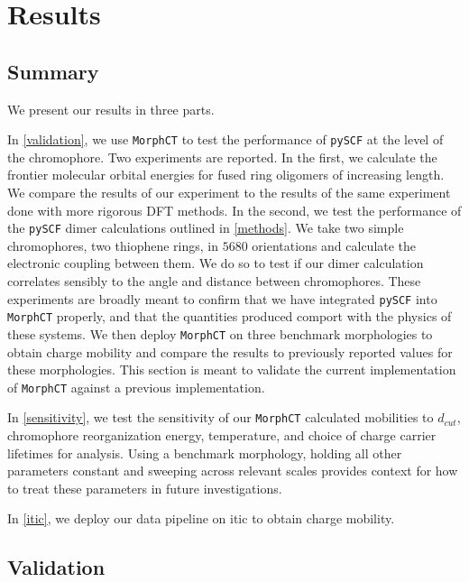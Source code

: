 \chapter{Results}
\label{results}

\section{Summary}

We present our results in three parts. 

In \autoref{validation}, we use \texttt{MorphCT} to test the performance of \texttt{pySCF} at the level of the chromophore.
Two experiments are reported. In the first, we calculate the frontier molecular orbital
energies for fused ring oligomers of increasing length. We compare the results of our experiment to the
results of the same experiment done with more rigorous DFT methods. In the second, we test the 
performance of the \texttt{pySCF} dimer calculations outlined in \autoref{methods}. 
We take two simple chromophores, two thiophene rings, in $5680$ orientations and calculate the
electronic coupling between them. We do so to test if our dimer calculation correlates sensibly to the angle
and distance between chromophores. These experiments are broadly meant to confirm that we have integrated
\texttt{pySCF} into \texttt{MorphCT} properly, and that the quantities produced comport with the physics of these systems.
We then deploy \texttt{MorphCT} on three benchmark  morphologies to obtain charge mobility
and compare the results to previously reported values for these morphologies. This section is meant to
validate the current implementation of \texttt{MorphCT} against a previous implementation. 

In \autoref{sensitivity}, we test the sensitivity of our \texttt{MorphCT}
calculated mobilities to $d_{cut}$, chromophore
reorganization energy,  temperature, and choice of charge carrier lifetimes for  analysis. Using a
benchmark  morphology, holding all other parameters constant and sweeping across relevant scales
provides context for how to treat these parameters in future investigations. 

In \autoref{itic}, we deploy our data pipeline on \gls{itic} to obtain charge mobility. 

\section{Validation}

